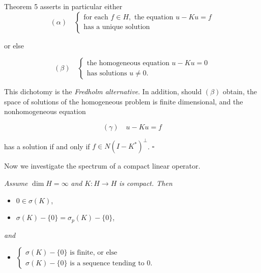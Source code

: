 \begin{remark}
\label{rem:fredholm-alternative-dichotomy}
Theorem 5 asserts in particular either
$$(\alpha) \quad \left\{ \begin{array}{l} \text{for each } f \in H, \text{ the equation } u - Ku = f \\ \text{has a unique solution} \end{array} \right.$$

or else

$$(\beta) \quad \left\{ \begin{array}{l} \text{the homogeneous equation } u - Ku = 0 \\ \text{has solutions } u \neq 0. \end{array} \right.$$

This dichotomy is the \textit{Fredholm alternative}. In addition, should $(\beta)$ obtain, the space of solutions of the homogeneous problem is finite dimensional, and the nonhomogeneous equation

$$(\gamma) \quad u - Ku = f$$

has a solution if and only if $f \in N(I - K^*)^{\perp}$. $\square$
\end{remark}

Now we investigate the spectrum of a compact linear operator.

\begin{theorem}
\label{thm:spectrum-of-compact-operator}
\textit{Assume} $\dim H = \infty$ \textit{and} $K : H \to H$ \textit{is compact. Then}
\begin{itemize}
\item[(i)] $0 \in \sigma(K)$,
\item[(ii)] $\sigma(K) - \{0\} = \sigma_p(K) - \{0\}$,
\end{itemize}
\textit{and}
\begin{itemize}
\item[(iii)] $\left\{ \begin{array}{l} \sigma(K) - \{0\} \text{ is finite, or else} \\ \sigma(K) - \{0\} \text{ is a sequence tending to } 0. \end{array} \right.$
\end{itemize}
\end{theorem}

